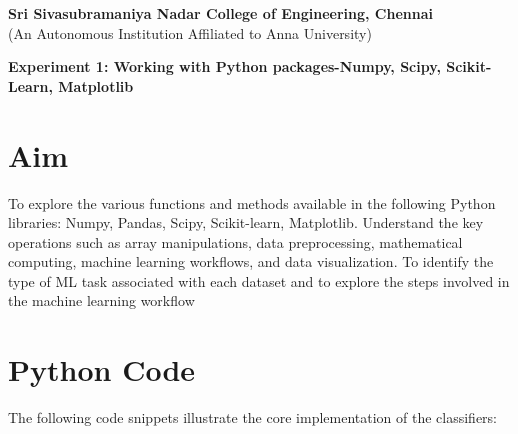 \documentclass[11pt]{article}
\begin{document}
\begin{center}
    \large \textbf{Sri Sivasubramaniya Nadar College of Engineering, Chennai} \\
    (An Autonomous Institution Affiliated to Anna University) \\
    \vspace{0.3cm}
\end{center}

\begin{table}[!h]
\renewcommand{\arraystretch}{1.5}
\end{table}

\begin{center}
\textbf{Experiment 1: Working with Python packages-Numpy, Scipy, Scikit-Learn,
Matplotlib}
\end{center}

\section{Aim}
To explore the various functions and methods available in the following Python libraries: Numpy, Pandas, Scipy, Scikit-learn, Matplotlib. Understand the key operations such as array manipulations, data preprocessing, mathematical computing, machine learning workflows, and data visualization. To identify the type of ML task associated with each dataset and to explore the steps involved in the machine learning workflow

\section{Python Code}
The following code snippets illustrate the core implementation of the classifiers:
\end{document}
